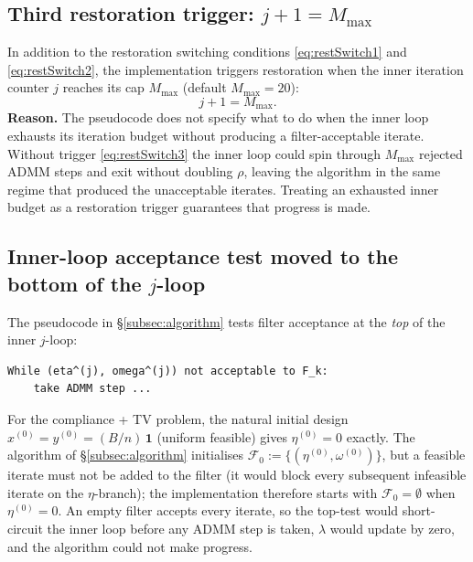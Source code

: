 \documentclass[11pt]{article}
\begin{document}
\subsection{Third restoration trigger: $j+1 = M_{\max}$}\label{subsec:trig-M}

In addition to the restoration switching conditions \eqref{eq:restSwitch1} and \eqref{eq:restSwitch2}, the implementation triggers restoration when the inner iteration counter $j$ reaches its cap $M_{\max}$ (default $M_{\max} = 20$):
\begin{equation}\label{eq:restSwitch3}
  j + 1 = M_{\max}.
\end{equation}
\noindent\textbf{Reason.} The pseudocode does not specify what to do when the inner loop exhausts its iteration budget without producing a filter-acceptable iterate. Without trigger \eqref{eq:restSwitch3} the inner loop could spin through $M_{\max}$ rejected ADMM steps and exit without doubling $\rho$, leaving the algorithm in the same regime that produced the unacceptable iterates. Treating an exhausted inner budget as a restoration trigger guarantees that progress is made.

\subsection{Inner-loop acceptance test moved to the bottom of the $j$-loop}\label{subsec:bottom-test}

The pseudocode in \S\ref{subsec:algorithm} tests filter acceptance at the \emph{top} of the inner $j$-loop:
\begin{verbatim}
While (eta^(j), omega^(j)) not acceptable to F_k:
    take ADMM step ...
\end{verbatim}
For the compliance + TV problem, the natural initial design $x^{(0)} = y^{(0)} = (B/n)\,\mathbf{1}$ (uniform feasible) gives $\eta^{(0)} = 0$ exactly. The algorithm of \S\ref{subsec:algorithm} initialises $\mathcal{F}_0 := \{(\eta^{(0)}, \omega^{(0)})\}$, but a feasible iterate must not be added to the filter (it would block every subsequent infeasible iterate on the $\eta$-branch); the implementation therefore starts with $\mathcal{F}_0 = \emptyset$ when $\eta^{(0)} = 0$. An empty filter accepts every iterate, so the top-test would short-circuit the inner loop before any ADMM step is taken, $\lambda$ would update by zero, and the algorithm could not make progress.
\end{document}
